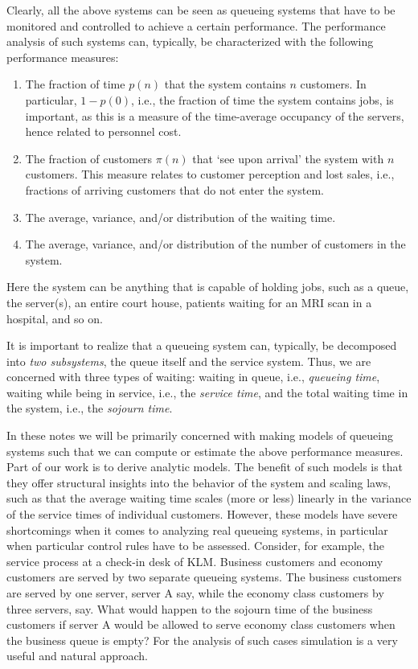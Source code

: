 Clearly, all the above systems can be seen as queueing systems that
have to be monitored and controlled to achieve a certain
performance. The performance analysis of such systems can, typically,
be characterized with the following performance measures:
\begin{enumerate}
\item The fraction of time $p(n)$ that the system contains $n$
  customers. In particular, $1-p(0)$, i.e., the fraction of time the
  system contains jobs, is important, as this is a measure of the
  time-average occupancy of the servers, hence related to personnel
  cost.
\item The fraction of customers $\pi(n)$ that `see upon arrival' the
  system with $n$ customers. This measure relates to customer
  perception and lost sales, i.e., fractions of arriving customers
  that do not enter the system.
\item The average, variance, and/or distribution of the waiting time.
\item The average, variance, and/or distribution of the number of customers in the system.\
\end{enumerate}
Here the system can be anything that is capable of holding jobs, such
as a queue, the server(s), an entire court house, patients waiting for
an MRI scan in a hospital, and so on.

It is important to realize that a queueing system can, typically, be
decomposed into \emph{two subsystems}, the queue itself and the
service system. Thus, we are concerned with three types of waiting:
waiting in queue, i.e., \emph{queueing time}, waiting while being in
service, i.e., the \emph{service time}, and the total waiting time in
the system, i.e., the \emph{sojourn time}.

In these notes we will be primarily concerned with making models of
queueing systems such that we can compute or estimate the above
performance measures.  Part of our work is to derive analytic
models. The benefit of such models is that they offer structural
insights into the behavior of the system and scaling laws, such as
that the average waiting time scales (more or less) linearly in the
variance of the service times of individual customers. However, these
models have severe shortcomings when it comes to analyzing real
queueing systems, in particular when particular control rules have to
be assessed.  Consider, for example, the service process at a check-in
desk of KLM. Business customers and economy customers are served by
two separate queueing systems. The business customers are served by
one server, server A say, while the economy class customers by three
servers, say. What would happen to the sojourn time of the business
customers if server A would be allowed to serve economy class
customers when the business queue is empty? For the analysis of such
cases simulation is a very useful and natural approach.

